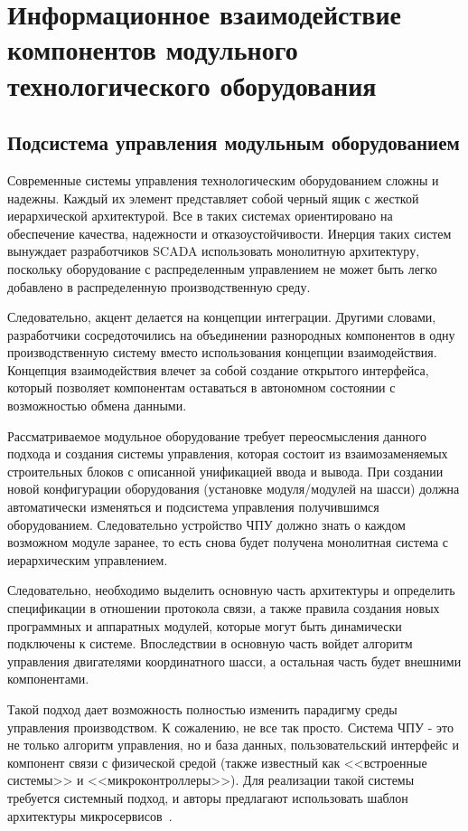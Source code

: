 \chapter{Информационное взаимодействие компонентов модульного технологического оборудования}\label{ch:ch3}

\section{Подсистема управления модульным оборудованием}\label{sec:ch3/sec1}

Современные системы управления технологическим оборудованием сложны и надежны. Каждый их элемент представляет собой черный ящик с жесткой иерархической архитектурой. Все в таких системах ориентировано на обеспечение качества, надежности и отказоустойчивости. Инерция таких систем вынуждает разработчиков SCADA использовать монолитную архитектуру, поскольку оборудование с распределенным управлением не может быть легко добавлено в распределенную производственную среду.

Следовательно, акцент делается на концепции интеграции. Другими словами, разработчики сосредоточились на объединении разнородных компонентов в одну производственную систему вместо использования концепции взаимодействия. Концепция взаимодействия влечет за собой создание открытого интерфейса, который позволяет компонентам оставаться в автономном состоянии с возможностью обмена данными.

Рассматриваемое модульное оборудование требует переосмысления данного подхода и создания системы управления, которая состоит из взаимозаменяемых строительных блоков с описанной унификацией ввода и вывода. При создании новой конфигурации оборудования (установке модуля/модулей на шасси) должна автоматически изменяться и подсистема управления получившимся оборудованием. Следовательно устройство ЧПУ должно знать о каждом возможном модуле заранее, то есть снова будет получена монолитная система с иерархическим управлением.

Следовательно, необходимо выделить основную часть архитектуры и определить спецификации в отношении протокола связи, а также правила создания новых программных и аппаратных модулей, которые могут быть динамически подключены к системе. Впоследствии в основную часть войдет алгоритм управления двигателями координатного шасси, а остальная часть будет внешними компонентами.

Такой подход дает возможность полностью изменить парадигму среды управления производством. К сожалению, не все так просто. Система ЧПУ - это не только алгоритм управления, но и база данных, пользовательский интерфейс и компонент связи с физической средой (также известный как <<встроенные системы>> и <<микроконтроллеры>>). Для реализации такой системы требуется системный подход, и авторы предлагают использовать шаблон архитектуры микросервисов~\cite{microservices2017indin}.

